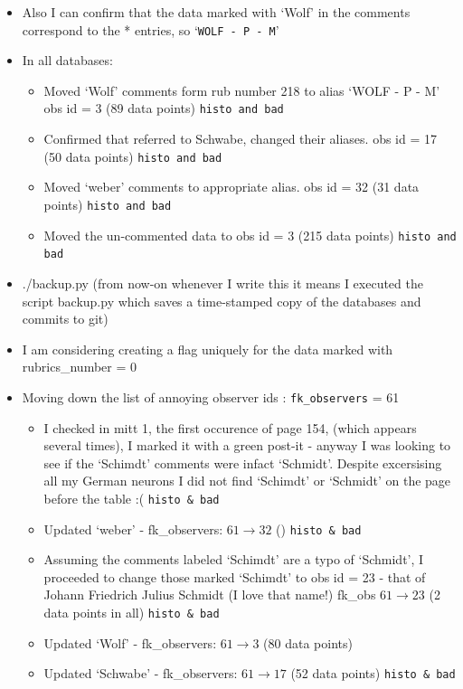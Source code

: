\documentclass[12pt]{article}
\begin{document}
\begin{itemize}
    \item Also I can confirm that the data marked with `Wolf' in the comments correspond to the * entries, so `\texttt{WOLF - P - M}'
    \item In all databases:
    \begin{itemize}
        \item Moved `Wolf' comments form rub number 218 to alias `WOLF - P - M' obs id = 3 (89 data points) \texttt{histo and bad}
        \item Confirmed that \dag{} referred to Schwabe, changed their aliases. obs id = 17 (50 data points) \texttt{histo and bad}
        \item Moved `weber' comments to appropriate alias. obs id = 32 (31 data points) \texttt{histo and bad}
        \item Moved the un-commented data to obs id = 3 (215 data points) \texttt{histo and bad}
    \end{itemize}
    \item ./backup.py (from now-on whenever I write this it means I executed the script backup.py which saves a time-stamped copy of the databases and commits to git)
    \item I am considering creating a flag uniquely for the data marked with rubrics\_number = 0
    \item Moving down the list of annoying observer ids : \texttt{fk\_observers} = 61
    \begin{itemize}
        \item I checked in mitt 1, the first occurence of page 154, (which appears several times), I marked it with a green post-it - anyway I was looking to see if the `Schimdt' comments were infact `Schmidt'. Despite excersising all my German neurons I did not find `Schimdt' or `Schmidt' on the page before the table :( \texttt{histo \& bad}
        \item Updated `weber' - fk\_observers: $61\to 32$ () \texttt{histo \& bad}
        \item Assuming the comments labeled `Schimdt' are a typo of `Schmidt', I proceeded to change those marked `Schimdt' to obs id = 23 - that of Johann Friedrich  Julius Schmidt (I love that name!) fk\_obs $61\to 23$ (2 data points in all) \texttt{histo & bad}
        \item Updated `Wolf' - fk\_observers: $61\to 3$ (80 data points) 
        \item Updated `Schwabe' - fk\_observers: $61\to 17$ (52 data points) \texttt{histo \& bad}

\end{itemize}
\end{itemize}
\end{document}
